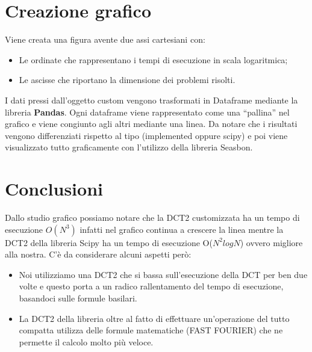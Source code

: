 \documentclass[12pt]{article}
\begin{document}
\section{Creazione grafico}

	Viene creata una figura avente due assi cartesiani con:
	\begin{itemize}
		\item Le ordinate che rappresentano i tempi di esecuzione in scala logaritmica;
		\item Le ascisse che riportano la dimensione dei problemi risolti.
	\end{itemize}
	I dati pressi dall’oggetto custom vengono trasformati in Dataframe mediante la libreria \textbf{Pandas}.\newline
Ogni dataframe viene rappresentato come una “pallina” nel grafico e viene congiunto agli altri mediante una linea. Da notare che i risultati vengono differenziati rispetto al tipo (implemented oppure scipy) e poi viene visualizzato tutto graficamente con l’utilizzo della libreria Seasbon.
	
\section{Conclusioni}
	Dallo studio grafico possiamo notare che la DCT2 customizzata ha un tempo di esecuzione $O(N^3)$ infatti nel grafico continua a crescere la linea mentre la DCT2 della libreria Scipy ha un tempo di esecuzione O($N^2logN$) ovvero migliore alla nostra.\newline
C’è da considerare alcuni aspetti però:
	\begin{itemize}
		\item Noi utilizziamo una DCT2 che si bassa sull’esecuzione della DCT per ben due volte e questo porta a un radico rallentamento del tempo di esecuzione, basandoci sulle formule basilari.
		\item La DCT2 della libreria oltre al fatto di effettuare un’operazione del tutto compatta utilizza delle formule matematiche (FAST FOURIER) che ne permette il calcolo molto più veloce.
	\end{itemize}
\end{document}
